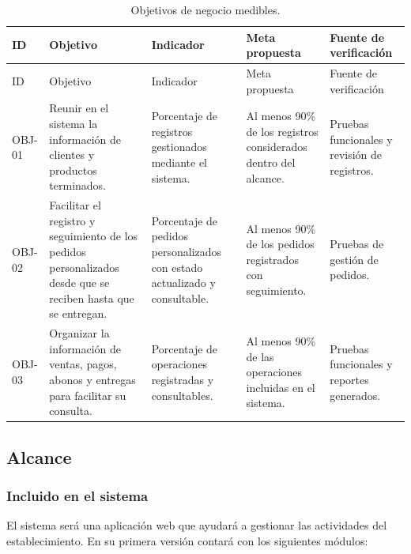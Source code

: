 \documentclass[11pt,a4paper]{article}
\begin{document}
	{\small
		\begin{xltabular}{\textwidth}{@{}lYYYY@{}}
			\caption{Objetivos de negocio medibles.}\label{tab:objetivos}\\
			\toprule
			ID & Objetivo & Indicador & Meta propuesta & Fuente de verificación \\
			\midrule
			\endfirsthead
			\toprule
			ID & Objetivo & Indicador & Meta propuesta & Fuente de verificación \\
			\midrule
			\endhead
			\bottomrule
			\endfoot
			
			OBJ-01 &
			Reunir en el sistema la información de clientes y productos terminados. &
			Porcentaje de registros gestionados mediante el sistema. &
			Al menos 90\% de los registros considerados dentro del alcance. &
			Pruebas funcionales y revisión de registros. \\
			
			OBJ-02 &
			Facilitar el registro y seguimiento de los pedidos personalizados desde que se reciben hasta que se entregan. &
			Porcentaje de pedidos personalizados con estado actualizado y consultable. &
			Al menos 90\% de los pedidos registrados con seguimiento. &
			Pruebas de gestión de pedidos. \\
			
			OBJ-03 &
			Organizar la información de ventas, pagos, abonos y entregas para facilitar su consulta. &
			Porcentaje de operaciones registradas y consultables. &
			Al menos 90\% de las operaciones incluidas en el sistema. &
			Pruebas funcionales y reportes generados. \\
		\end{xltabular}
	}
	
	\subsection{Alcance}
	
	\subsubsection{Incluido en el sistema}
	
	El sistema será una aplicación web que ayudará a gestionar las actividades del establecimiento. En su primera versión contará con los siguientes módulos:
	
\end{document}
